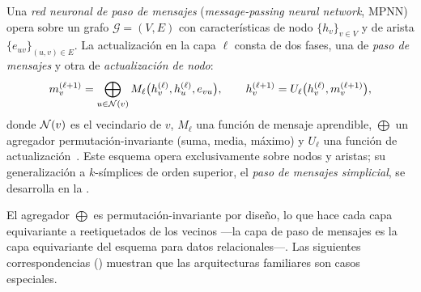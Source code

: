 \begin{definition}
\label{def:priors:mpnn}
Una \emph{red neuronal de paso de mensajes} (\emph{message-passing neural
network}, MPNN) opera sobre un grafo $\mathcal{G} = (V, E)$ con caracter\'isticas
de nodo $\{h_v\}_{v \in V}$ y de arista $\{e_{uv}\}_{(u,v) \in E}$. La
actualizaci\'on en la capa $\ell$ consta de dos fases, una de \emph{paso de
mensajes} y otra de \emph{actualizaci\'on de nodo}:
\[
  m_v^{(\ell+1)} = \bigoplus_{u \in \mathcal{N}(v)}
      M_\ell\bigl(h_v^{(\ell)}, h_u^{(\ell)}, e_{vu}\bigr),
  \qquad
  h_v^{(\ell+1)} = U_\ell\bigl(h_v^{(\ell)}, m_v^{(\ell+1)}\bigr),
\]
donde $\mathcal{N}(v)$ es el vecindario de $v$, $M_\ell$ una funci\'on de mensaje
aprendible, $\bigoplus$ un agregador permutaci\'on-invariante (suma, media,
m\'aximo) y $U_\ell$ una funci\'on de actualizaci\'on~\citep{gilmer2017neural}.
Este esquema opera exclusivamente sobre nodos y aristas; su generalizaci\'on a
$k$-s\'implices de orden superior, el \emph{paso de mensajes simplicial}, se
desarrolla en la .
\end{definition}

El agregador $\bigoplus$ es permutaci\'on-invariante por dise\~no, lo que hace cada
capa equivariante a reetiquetados de los vecinos ---la capa de paso de mensajes es
la capa equivariante del esquema para datos relacionales---. Las siguientes
correspondencias () muestran que las arquitecturas
familiares son casos especiales.

